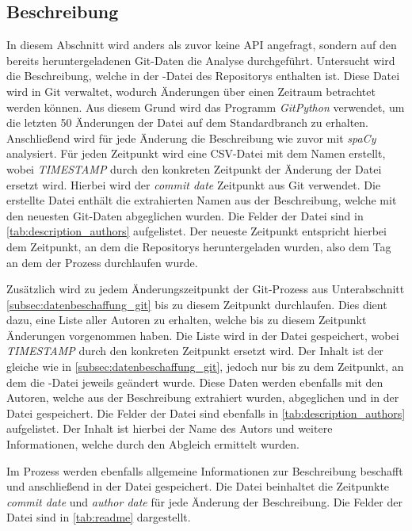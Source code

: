 \subsection{Beschreibung}
\label{subsec:datenbeschaffung_beschreibung}
In diesem Abschnitt wird anders als zuvor keine API angefragt, sondern auf den bereits heruntergeladenen Git-Daten die Analyse durchgeführt.
Untersucht wird die Beschreibung, welche in der -Datei des Repositorys enthalten ist.
Diese Datei wird in Git verwaltet, wodurch Änderungen über einen Zeitraum betrachtet werden können.
Aus diesem Grund wird das Programm \emph{GitPython} verwendet, um die letzten 50 Änderungen der Datei auf dem Standardbranch zu erhalten.
Anschließend wird für jede Änderung die Beschreibung wie zuvor mit \emph{spaCy} analysiert.
Für jeden Zeitpunkt wird eine CSV-Datei mit dem Namen  erstellt, wobei \emph{TIMESTAMP} durch den konkreten Zeitpunkt der Änderung der Datei ersetzt wird.
Hierbei wird der \emph{commit date} Zeitpunkt aus Git verwendet.
Die erstellte Datei enthält die extrahierten Namen aus der Beschreibung, welche mit den neuesten Git-Daten abgeglichen wurden.
Die Felder der Datei sind in \autoref{tab:description_authors} aufgelistet.
Der neueste Zeitpunkt entspricht hierbei dem Zeitpunkt, an dem die Repositorys heruntergeladen wurden, also dem Tag an dem der Prozess durchlaufen wurde.

Zusätzlich wird zu jedem Änderungszeitpunkt der Git-Prozess aus Unterabschnitt \ref{subsec:datenbeschaffung_git} bis zu diesem Zeitpunkt durchlaufen.
Dies dient dazu, eine Liste aller Autoren zu erhalten, welche bis zu diesem Zeitpunkt Änderungen vorgenommen haben.
Die Liste wird in der Datei  gespeichert, wobei \emph{TIMESTAMP} durch den konkreten Zeitpunkt ersetzt wird.
Der Inhalt ist der gleiche wie in \autoref{subsec:datenbeschaffung_git}, jedoch nur bis zu dem Zeitpunkt, an dem die -Datei jeweils geändert wurde.
Diese Daten werden ebenfalls mit den Autoren, welche aus der Beschreibung extrahiert wurden, abgeglichen und in der Datei  gespeichert.
Die Felder der Datei sind ebenfalls in \autoref{tab:description_authors} aufgelistet.
Der Inhalt ist hierbei der Name des Autors und weitere Informationen, welche durch den Abgleich ermittelt wurden.

Im Prozess werden ebenfalls allgemeine Informationen zur Beschreibung beschafft und anschließend in der Datei  gespeichert.
Die Datei beinhaltet die Zeitpunkte \emph{commit date} und \emph{author date} für jede Änderung der Beschreibung.
Die Felder der Datei sind in \autoref{tab:readme} dargestellt.

